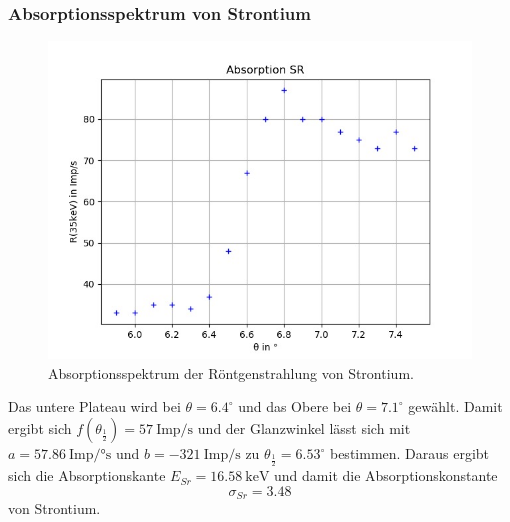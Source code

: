 \subsubsection*{Absorptionsspektrum von Strontium}
\begin{figure}[H]
  \centering
  \includegraphics{content/Sr.png}
  \caption{Absorptionsspektrum der Röntgenstrahlung von Strontium.}
  \label{fig:sr}
\end{figure}
Das untere Plateau wird bei $\theta=6.4^\circ$ und das Obere bei $\theta=7.1^\circ$ gewählt. Damit ergibt sich $f(\theta_{\frac{1}{2}})=57\ \textrm{Imp/s}$ und der Glanzwinkel lässt sich mit $a=57.86\ \textrm{Imp/°s}$ und $b=-321\ \textrm{Imp/s}$ zu $\theta_{\frac{1}{2}}=6.53^\circ$ bestimmen. Daraus ergibt sich die Absorptionskante $E_{Sr}=16.58\ \textrm{keV}$ und damit die Absorptionskonstante
\begin{equation*}
  \sigma_{Sr}=3.48
\end{equation*}
von Strontium.
  

